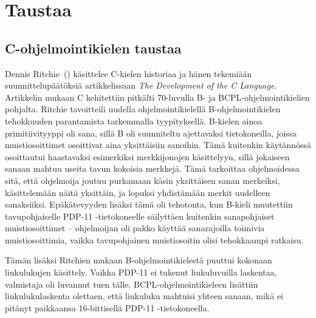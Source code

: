 \section{Taustaa}


\subsection{C-ohjelmointikielen taustaa}
\label{sec:ctaustaa}


Dennis Ritchie~(\citeyear{chistory}) käsittelee C-kielen historiaa ja hänen
tekemiään suunnittelupäätöksiä artikkelissaan \emph{The Development of the C
Language}. Artikkelin mukaan C kehitettiin pitkälti 70-luvulla B- ja
BCPL-ohjelmointikielien pohjalta. Ritchie tavoitteili uudella
ohjelmointikielellä B-ohjelmointikielen tehokkuuden parantamista tarkemmalla
tyypityksellä. B-kielen ainoa primitiivityyppi oli sana, sillä B oli suunniteltu ajettavaksi
tietokoneilla, joissa muistiosoittimet osoittivat aina yksittäisiin sanoihin.
Tämä kuitenkin käytännössä osoittautui haastavaksi esimerkiksi merkkijonojen
käsittelyyn, sillä jokaiseen sanaan mahtuu useita tavun kokoisia
merkkejä. Tämä tarkoittaa ohjelmoidessa sitä, että ohjelmoija joutuu purkamaan
käsin yksittäisen sanan merkeiksi, käsittelemään näitä yksittäin, ja lopuksi
yhdistämään merkit uudelleen sanaksiiksi. Epäkätevyyden lisäksi tämä oli
tehotonta, kun B-kieli muutettiin tavupohjaiselle PDP-11 -tietokoneelle
säilyttäen kuitenkin sanapohjaiset muistiosoittimet -- ohjelmoijan oli pakko
käyttää sanarajoilla toimivia muistiosoittimia, vaikka tavupohjainen
muistiosoitin olisi tehokkaampi ratkaisu.

Tämän lisäksi Ritchien mukaan B-ohjelmointikielestä puuttui kokonaan
liukulukujen käsittely. Vaikka PDP-11 ei tukenut liukuluvuilla laskentaa,
valmistaja oli luvannut tuen tälle. BCPL-ohjelmointikieleen lisättiin
liukulukulaskenta olettaen, että liukuluku mahtuisi yhteen sanaan, mikä ei
pitänyt paikkaansa 16-bittisellä PDP-11 -tietokoneella.

